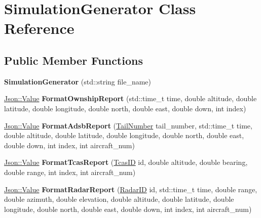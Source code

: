 \hypertarget{class_simulation_generator}{}\section{Simulation\+Generator Class Reference}
\label{class_simulation_generator}
\subsection*{Public Member Functions}
\begin{DoxyCompactItemize}
\item 
\hypertarget{class_simulation_generator_ad5f8fa751d19fe2a69e75f93146fe2cb}{}{\bfseries Simulation\+Generator} (std\+::string file\+\_\+name)\label{class_simulation_generator_ad5f8fa751d19fe2a69e75f93146fe2cb}

\item 
\hypertarget{class_simulation_generator_a6efa316990047e3f298be5867e19b993}{}\hyperlink{class_json_1_1_value}{Json\+::\+Value} {\bfseries Format\+Ownship\+Report} (std\+::time\+\_\+t time, double altitude, double latitude, double longitude, double north, double east, double down, int index)\label{class_simulation_generator_a6efa316990047e3f298be5867e19b993}

\item 
\hypertarget{class_simulation_generator_ad598c401f94712d3c28b3957b54d0f1a}{}\hyperlink{class_json_1_1_value}{Json\+::\+Value} {\bfseries Format\+Adsb\+Report} (\hyperlink{class_tail_number}{Tail\+Number} tail\+\_\+number, std\+::time\+\_\+t time, double altitude, double latitude, double longitude, double north, double east, double down, int index, int aircraft\+\_\+num)\label{class_simulation_generator_ad598c401f94712d3c28b3957b54d0f1a}

\item 
\hypertarget{class_simulation_generator_a0f6633c34f8306e6244be3ec98e01005}{}\hyperlink{class_json_1_1_value}{Json\+::\+Value} {\bfseries Format\+Tcas\+Report} (\hyperlink{class_tcas_i_d}{Tcas\+I\+D} id, double altitude, double bearing, double range, int index, int aircraft\+\_\+num)\label{class_simulation_generator_a0f6633c34f8306e6244be3ec98e01005}

\item 
\hypertarget{class_simulation_generator_a1c1b10ce13c0ae24a85bc4330977b0cf}{}\hyperlink{class_json_1_1_value}{Json\+::\+Value} {\bfseries Format\+Radar\+Report} (\hyperlink{class_radar_i_d}{Radar\+I\+D} id, std\+::time\+\_\+t time, double range, double azimuth, double elevation, double altitude, double latitude, double longitude, double north, double east, double down, int index, int aircraft\+\_\+num)\label{class_simulation_generator_a1c1b10ce13c0ae24a85bc4330977b0cf}


\end{DoxyCompactItemize}

